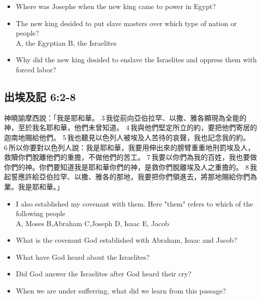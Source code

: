 \begin{itemize}
\item Where was Josephe when the new king came to power in Egypt?
\item The new king desided to put slave masters over which type of nation or people?\\
A, the Egyptian \hspace{2cm} B, the Israelites
\item Why did the new king desided to enslave the Israelites and oppress them with forced labor?
\end{itemize}

\subsection{出埃及記 6:2-8}
神曉諭摩西說：「我是耶和華。 3 我從前向亞伯拉罕、以撒、雅各顯現為全能的神，至於我名耶和華，他們未曾知道。 4 我與他們堅定所立的約，要把他們寄居的迦南地賜給他們。 5 我也聽見以色列人被埃及人苦待的哀聲，我也記念我的約。 6 所以你要對以色列人說：我是耶和華，我要用伸出來的膀臂重重地刑罰埃及人，救贖你們脫離他們的重擔，不做他們的苦工。 7 我要以你們為我的百姓，我也要做你們的神。你們要知道我是耶和華你們的神，是救你們脫離埃及人之重擔的。 8 我起誓應許給亞伯拉罕、以撒、雅各的那地，我要把你們領進去，將那地賜給你們為業。我是耶和華。」



\begin{itemize}
\item I also established my covenant with them. Here "them" refers to which of the following people\\
A, Moses \hspace{1cm} B,Abraham \hspace{1cm} C,Joseph \hspace{1cm} D, Isaac  \hspace{1cm} E, Jacob 
\item What is the covenant God established with Abraham, Isaac and Jacob?
\item What have God heard about the Israelites?
\item Did God answer the Israelites after God heard their cry?
\item When we are under sufferring, what did we learn from this passage?
\end{itemize}



